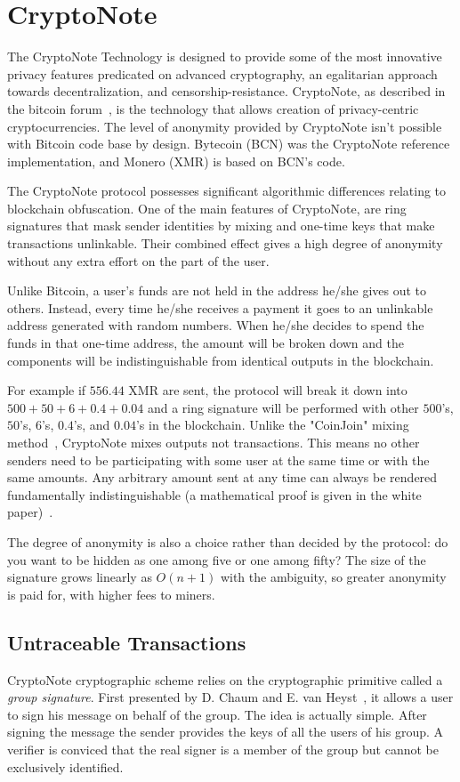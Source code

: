 \section{\label{sec:CryptoNote}CryptoNote}
The CryptoNote Technology is designed to provide some of the most innovative privacy features predicated on advanced cryptography, an egalitarian approach towards decentralization, and censorship-resistance. CryptoNote, as described in the bitcoin forum~\cite{btcforum}, is the technology that allows creation of privacy-centric cryptocurrencies. The level of anonymity provided by CryptoNote isn't possible with Bitcoin code base by design. Bytecoin (BCN) was the CryptoNote reference implementation, and Monero (XMR) is based on BCN's code.

The CryptoNote protocol possesses significant algorithmic differences relating to blockchain obfuscation. One of the main features of CryptoNote, are ring signatures that mask sender identities by mixing and one-time keys that make transactions unlinkable. Their combined effect gives a high degree of anonymity without any extra effort on the part of the user.

Unlike Bitcoin, a user's funds are not held in the address he/she gives out to others. Instead, every time he/she receives a payment it goes to an unlinkable address generated with random numbers. When he/she decides to spend the funds in that one-time address, the amount will be broken down and the components will be indistinguishable from identical outputs in the blockchain.

For example if $556.44$ XMR are sent, the protocol will break it down into $500 + 50 + 6 + 0.4 + 0.04$ and a ring signature will be performed with other $500$'s, $50$'s, $6$'s, $0.4$'s, and $0.04$'s in the blockchain. Unlike the "CoinJoin" mixing method~\cite{coinjoin}, CryptoNote mixes outputs not transactions. This means no other senders need to be participating with some user at the same time or with the same amounts. Any arbitrary amount sent at any time can always be rendered fundamentally indistinguishable (a mathematical proof is given in the white paper)~\cite{citeulike:14139412}.

The degree of anonymity is also a choice rather than decided by the protocol: do you want to be hidden as one among five or one among fifty? The size of the signature grows linearly as $O(n+1)$ with the ambiguity, so greater anonymity is paid for, with higher fees to miners.

\subsection{Untraceable Transactions} \label{sec:untraceable}
CryptoNote cryptographic scheme relies on the cryptographic primitive called a \emph{group signature}. First presented by D. Chaum and E. van Heyst~\cite{group}, it allows a user to sign his message on behalf of the group. The idea is actually simple. After signing the message the sender provides the keys of all the users of his group. A verifier is conviced that the real signer is a member of the group but cannot be exclusively identified.

